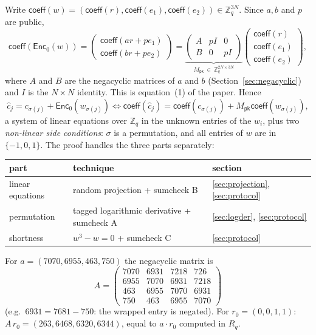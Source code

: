 \documentclass[11pt,a4paper]{article}
\newcommand{\Zq}{\mathbb{Z}_q}
\newcommand{\Rq}{R_q}
\newcommand{\EncZ}{\mathsf{Enc}_0}
\newcommand{\coeff}{\mathsf{coeff}}
\newcommand{\Mpk}{M_{\mathsf{pk}}}
\newcommand{\ch}{\hat{c}}
\theoremstyle{definition}
\theoremstyle{plain}
\begin{document}
Write $\coeff(w)=(\coeff(r),\coeff(e_1),\coeff(e_2))\in\Zq^{3N}$. Since $a,b$ and $p$ are public,
\[
  \coeff(\EncZ(w))=\begin{pmatrix}\coeff(ar+pe_1)\\\coeff(br+pe_2)\end{pmatrix}
  =\underbrace{\begin{pmatrix}A & pI & 0\\ B & 0 & pI\end{pmatrix}}_{\Mpk\ \in\ \Zq^{2N\times 3N}}
  \begin{pmatrix}\coeff(r)\\\coeff(e_1)\\\coeff(e_2)\end{pmatrix},
\]
where $A$ and $B$ are the negacyclic matrices of $a$ and $b$ (Section~\ref{sec:negacyclic}) and $I$ is
the $N\times N$ identity. This is equation~(1) of the paper. Hence
\[
  \ch_j=c_{\sigma(j)}+\EncZ(w_{\sigma(j)})
  \iff
  \coeff(\ch_j)=\coeff(c_{\sigma(j)})+\Mpk\coeff(w_{\sigma(j)}),
\]
a system of linear equations over $\Zq$ in the unknown entries of the $w_i$, plus two
\emph{non-linear side conditions}: $\sigma$ is a permutation, and all entries of $w$ are in
$\{-1,0,1\}$. The proof handles the three parts separately:
\begin{center}
\begin{tabular}{@{}lll@{}}
\toprule
part & technique & section\\\midrule
linear equations & random projection + sumcheck B & \ref{sec:projection}, \ref{sec:protocol}\\
permutation & tagged logarithmic derivative + sumcheck A & \ref{sec:logder}, \ref{sec:protocol}\\
shortness & $w^3-w=0$ + sumcheck C & \ref{sec:protocol}\\
\bottomrule
\end{tabular}
\end{center}

\begin{toyrun}
For $a=(7070,6955,463,750)$ the negacyclic matrix is
\[
A=\begin{pmatrix}7070&6931&7218&726\\6955&7070&6931&7218\\463&6955&7070&6931\\750&463&6955&7070\end{pmatrix}
\]
(e.g.\ $6931=7681-750$: the wrapped entry is negated). For $r_0=(0,0,1,1)$: $A\,r_0=(263,6468,6320,6344)$,
equal to $a\cdot r_0$ computed in $\Rq$.
\end{toyrun}
\end{document}

